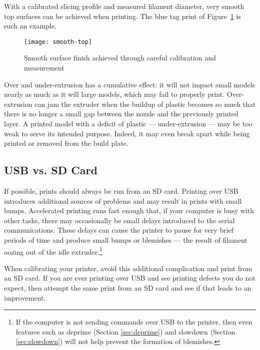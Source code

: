 With a calibrated slicing profile and measured filament diameter, very
smooth top surfaces can be achieved when printing.  The blue tag print of
Figure~\ref{fig:smooth-top} is such an example.

\begin{figure}[!htbp]
  \centering
    \texttt{[image: smooth-top]}
    \caption{Smooth surface finish achieved through careful calibration and measurement}
  \label{fig:smooth-top}
\end{figure}

Over and under-extrusion has a cumulative effect: it will not impact small
models nearly as much as it will large models, which may fail to properly print.  Over-extrusion can jam the extruder when the buildup of plastic becomes so much that there is no longer a small gap
between the nozzle and the previously printed layer.  A printed model with
a deficit of plastic --- under-extrusion --- may be too weak to serve
its intended purpose.  Indeed, it may even break apart while being printed
or removed from the build plate.


\subsection{USB vs. SD Card}

If possible, prints should always be run from an SD card.  Printing
over USB introduces additional sources of problems and may result in
prints with small bumps.  Accelerated printing runs fast enough that,
if your computer is busy with other tasks, there may occasionally be
small delays introduced to the serial communications.  These delays
can cause the printer to pause for very brief periods of time and
produce small bumps or blemishes --- the result of filament oozing out
of the idle extruder.\footnote{If the computer is not sending commands over USB to the printer, then even features such as deprime (Section \ref{sec:deprime}) and slowdown (Section \ref{sec:slowdown}) will not help prevent the formation of blemishes.}

When calibrating your printer, avoid this additional complication and print
from an SD card.  If you are ever printing over USB and see printing defects
you do not expect, then attempt the same print from an SD card and see
if that leads to an improvement.



